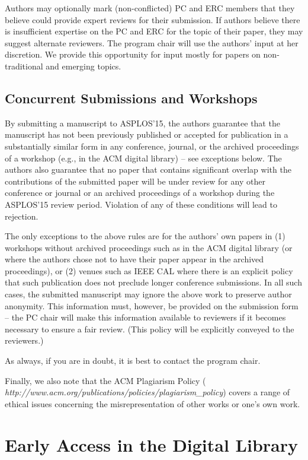 \documentclass[pageno]{jpaper}
\begin{document}
Authors may optionally mark (non-conflicted) PC and ERC members that they
believe could provide expert reviews for their submission.  If authors
believe there is insufficient expertise on the PC and ERC for the topic of
their paper, they may suggest alternate reviewers.  The program chair will
use the authors' input at her discretion.  We provide this opportunity
for input mostly for papers on non-traditional and emerging topics.


\subsection{Concurrent Submissions and Workshops}

By submitting a manuscript to ASPLOS'15, the authors guarantee that the
manuscript has not been previously published or accepted for publication in
a substantially similar form in any conference, journal, or the archived
proceedings of a workshop (e.g., in the ACM digital library) -- see
exceptions below. The authors also guarantee that no paper that contains
significant overlap with the contributions of the submitted paper will be
under review for any other conference or journal or an archived proceedings
of a workshop during the ASPLOS'15 review period. Violation of any of these
conditions will lead to rejection.

The only exceptions to the above rules are for the authors' own papers in
(1) workshops without archived proceedings such as in the ACM digital
library (or where the authors chose not to have their paper appear in the
archived proceedings), or (2) venues such as IEEE CAL where there is an
explicit policy that such publication does not preclude longer conference
submissions.  In all such cases, the submitted manuscript may ignore the
above work to preserve author anonymity. This information must, however, be
provided on the submission form -- the PC chair will make this information
available to reviewers if it becomes necessary to ensure a fair review.
(This policy will be explicitly conveyed to the reviewers.)

As always, if you are in doubt, it is best to contact the program chair.

Finally, we also note that the ACM Plagiarism Policy ({\em
http://www.acm.org/publications/policies/plagiarism\_policy}) covers a
range of ethical issues concerning the misrepresentation of other works or
one's own work.

\section{Early Access in the Digital Library}
\end{document}
